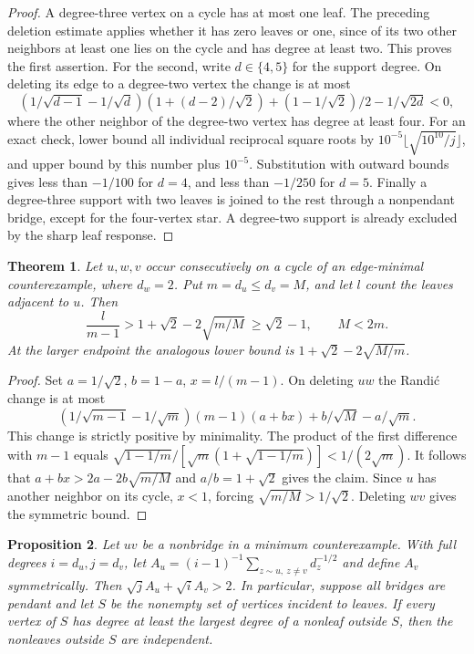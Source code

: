 \documentclass[11pt,a4paper]{article}
\newtheorem{theorem}{Theorem}[section]
\newtheorem{proposition}[theorem]{Proposition}
\begin{document}
\begin{proof}
A degree-three vertex on a cycle has at most one leaf. The preceding
deletion estimate applies whether it has zero leaves or one, since
of its two other neighbors at least one lies on the cycle and has
degree at least two. This proves the first assertion. For the second,
write $d\in\{4,5\}$ for the support degree. On deleting its edge to
a degree-two vertex the change is at most
\[
 (1/\sqrt{d-1}-1/\sqrt d)(1+(d-2)/\sqrt2)
       +(1-1/\sqrt2)/2-1/\sqrt{2d}<0,
\]
where the other neighbor of the degree-two vertex has degree at least
four. For an exact check, lower bound all individual reciprocal square
roots by $10^{-5}\lfloor\sqrt{10^{10}/j}\rfloor$, and upper bound by
this number plus $10^{-5}$. Substitution with outward bounds gives
less than $-1/100$ for $d=4$, and less than $-1/250$ for $d=5$.
Finally a degree-three support with two leaves is joined to the rest
through a nonpendant bridge, except for the four-vertex star. A
degree-two support is already excluded by the sharp leaf response.
\end{proof}
\begin{theorem}
Let $u,w,v$ occur consecutively on a cycle of an edge-minimal
counterexample, where $d_w=2$. Put $m=d_u\le d_v=M$, and let $l$
count the leaves adjacent to $u$. Then
\[
 \frac{l}{m-1}>1+\sqrt2-2\sqrt{m/M}\ \ge\sqrt2-1,
 \qquad M<2m .
\]
At the larger endpoint the analogous lower bound is
$1+\sqrt2-2\sqrt{M/m}$.
\end{theorem}
\begin{proof}
Set $a=1/\sqrt2$, $b=1-a$, $x=l/(m-1)$. On deleting $uw$
the Randi\'c change is at most
\[
 (1/\sqrt{m-1}-1/\sqrt m)(m-1)(a+bx)
        +b/\sqrt M-a/\sqrt m .
\]
This change is strictly positive by minimality. The product of the
first difference with $m-1$ equals
$\sqrt{1-1/m}/[\sqrt m(1+\sqrt{1-1/m})]<1/(2\sqrt m)$.
It follows that $a+bx>2a-2b\sqrt{m/M}$ and
$a/b=1+\sqrt2$ gives the claim. Since $u$ has another neighbor
on its cycle, $x<1$, forcing $\sqrt{m/M}>1/\sqrt2$.
Deleting $wv$ gives the symmetric bound.
\end{proof}
\begin{proposition}
Let $uv$ be a nonbridge in a minimum counterexample. With full
degrees $i=d_u,j=d_v$, let
$A_u=(i-1)^{-1}\sum_{z\sim u,\ z\ne v}d_z^{-1/2}$ and define
$A_v$ symmetrically. Then $\sqrt j A_u+\sqrt i A_v>2$.
In particular, suppose all bridges are pendant and let $S$ be the
nonempty set of vertices incident to leaves. If every vertex of $S$
has degree at least the largest degree of a nonleaf outside $S$,
then the nonleaves outside $S$ are independent.
\end{proposition}
\end{document}
